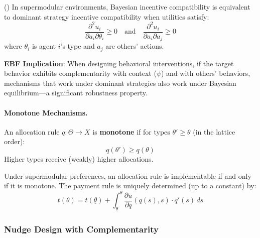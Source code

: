 \begin{theorem}
\label{thm:kushnir-liu}
\textup{(\citet{kushnir2019equivalence})} In supermodular environments, Bayesian 
incentive compatibility is equivalent to dominant strategy incentive compatibility 
when utilities satisfy:
\begin{equation}
\frac{\partial^2 u_i}{\partial a_i \partial \theta_i} \geq 0 \quad \text{and} \quad
\frac{\partial^2 u_i}{\partial a_i \partial a_j} \geq 0
\end{equation}
where $\theta_i$ is agent $i$'s type and $a_j$ are others' actions.
\end{theorem}

\textbf{EBF Implication}: When designing behavioral interventions, if the target 
behavior exhibits complementarity with context ($\psi$) and with others' behaviors, 
mechanisms that work under dominant strategies also work under Bayesian equilibrium---a 
significant robustness property.

\paragraph{Monotone Mechanisms.}

\begin{definition}
\label{def:monotone-allocation}
An allocation rule $q: \Theta \to X$ is \textbf{monotone} if for types 
$\theta' \geq \theta$ (in the lattice order):
\begin{equation}
q(\theta') \geq q(\theta)
\end{equation}
Higher types receive (weakly) higher allocations.
\end{definition}

\begin{proposition}
\label{prop:implement-comp}
Under supermodular preferences, an allocation rule is implementable if and only if 
it is monotone. The payment rule is uniquely determined (up to a constant) by:
\begin{equation}
t(\theta) = t(\underline{\theta}) + \int_{\underline{\theta}}^{\theta} 
\frac{\partial u}{\partial q}(q(s), s) \cdot q'(s) \, ds
\end{equation}
\end{proposition}

\subsubsection{Nudge Design with Complementarity}

